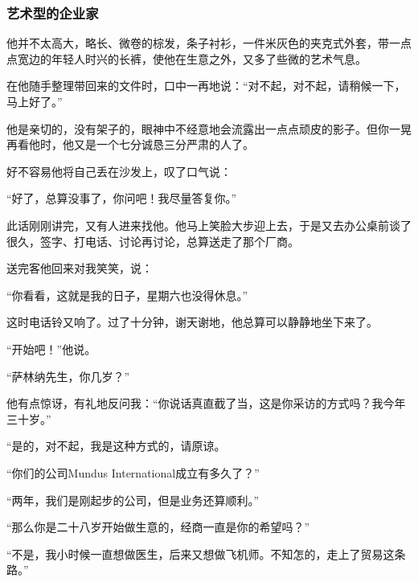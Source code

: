 \subsubsection*{艺术型的企业家}
\par 他并不太高大，略长、微卷的棕发，条子衬衫，一件米灰色的夹克式外套，带一点点宽边的年轻人时兴的长裤，使他在生意之外，又多了些微的艺术气息。
\par 在他随手整理带回来的文件时，口中一再地说：“对不起，对不起，请稍候一下，马上好了。”
\par 他是亲切的，没有架子的，眼神中不经意地会流露出一点点顽皮的影子。但你一晃再看他时，他又是一个七分诚恳三分严肃的人了。
\par 好不容易他将自己丢在沙发上，叹了口气说：
\par “好了，总算没事了，你问吧！我尽量答复你。”
\par 此话刚刚讲完，又有人进来找他。他马上笑脸大步迎上去，于是又去办公桌前谈了很久，签字、打电话、讨论再讨论，总算送走了那个厂商。
\par 送完客他回来对我笑笑，说：
\par “你看看，这就是我的日子，星期六也没得休息。”
\par 这时电话铃又响了。过了十分钟，谢天谢地，他总算可以静静地坐下来了。
\par “开始吧！”他说。
\par “萨林纳先生，你几岁？”
\par 他有点惊讶，有礼地反问我：“你说话真直截了当，这是你采访的方式吗？我今年三十岁。”
\par “是的，对不起，我是这种方式的，请原谅。
\par “你们的公司Mundus International成立有多久了？”
\par “两年，我们是刚起步的公司，但是业务还算顺利。”
\par “那么你是二十八岁开始做生意的，经商一直是你的希望吗？”
\par “不是，我小时候一直想做医生，后来又想做飞机师。不知怎的，走上了贸易这条路。”
